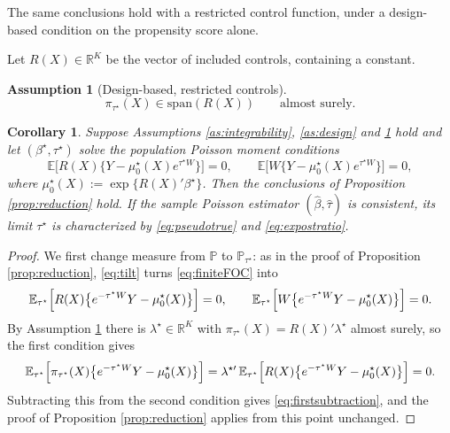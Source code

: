 \documentclass[11pt]{article}
\newtheorem{corollary}[theorem]{Corollary}
\newtheorem{assumptionprime}{Assumption}
\theoremstyle{definition}
\theoremstyle{plain}
\newcommand{\E}{\mathbb{E}}
\newcommand{\1}{\mathbf{1}}
\newcommand{\R}{\mathbb{R}}
\begin{document}
The same conclusions hold with a restricted control function, under a design-based condition on the propensity score alone.

Let $R(X)\in\R^K$ be the vector of included controls, containing a constant.

\begin{assumptionprime}[Design-based, restricted controls]
\label{as:designspan}
\begin{equation}
\pi_{\tau^\star}(X)\in \mathrm{span}(R(X))
\qquad \text{almost surely.}
\label{eq:spancondition}
\end{equation}
\end{assumptionprime}

\begin{corollary}
\label{cor:finite}
Suppose Assumptions \ref{as:integrability}, \ref{as:design} and \ref{as:designspan} hold and let $(\beta^\star,\tau^\star)$ solve the population Poisson moment conditions
\begin{equation}
\E\Big[R(X)\bigl\{Y-\mu_0^\star(X)e^{\tau^\star W}\bigr\}\Big]=0,
\qquad
\E\Big[W\bigl\{Y-\mu_0^\star(X)e^{\tau^\star W}\bigr\}\Big]=0,
\label{eq:finiteFOC}
\end{equation}
where $\mu_0^\star(X):=\exp\{R(X)'\beta^\star\}$.  Then the conclusions of Proposition \ref{prop:reduction} hold.  If the sample Poisson estimator $(\hat\beta,\hat\tau)$ is consistent, its limit $\tau^\star$ is characterized by \eqref{eq:pseudotrue} and \eqref{eq:expostratio}.
\end{corollary}

\begin{proof}
We first change measure from $\mathbb P$ to $\mathbb P_{\tau^\star}$: as in the proof of Proposition \ref{prop:reduction}, \eqref{eq:tilt} turns \eqref{eq:finiteFOC} into
\[
\E_{\tau^\star}\Bigl[R(X)\bigl\{e^{-\tau^\star W}Y-\mu_0^\star(X)\bigr\}\Bigr]=0,
\qquad
\E_{\tau^\star}\Bigl[W\bigl\{e^{-\tau^\star W}Y-\mu_0^\star(X)\bigr\}\Bigr]=0 .
\]
By Assumption \ref{as:designspan} there is $\lambda^\star\in\R^K$ with $\pi_{\tau^\star}(X)=R(X)'\lambda^\star$ almost surely, so the first condition gives
\[
\E_{\tau^\star}\Bigl[\pi_{\tau^\star}(X)\bigl\{e^{-\tau^\star W}Y-\mu_0^\star(X)\bigr\}\Bigr]
=\lambda^{\star\prime}\,\E_{\tau^\star}\Bigl[R(X)\bigl\{e^{-\tau^\star W}Y-\mu_0^\star(X)\bigr\}\Bigr]=0 .
\]
Subtracting this from the second condition gives \eqref{eq:firstsubtraction}, and the proof of Proposition \ref{prop:reduction} applies from this point unchanged.
\end{proof}
\end{document}
